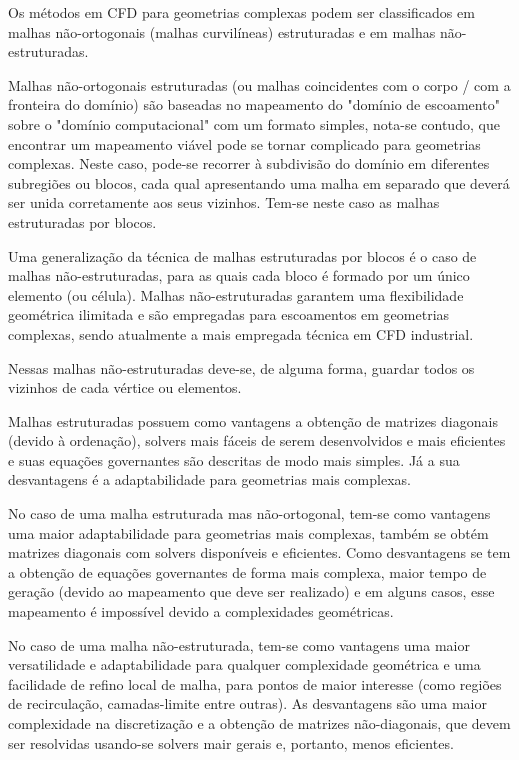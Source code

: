 Os métodos em CFD para geometrias complexas podem ser classificados em malhas não-ortogonais (malhas curvilíneas) estruturadas e em malhas não-estruturadas.

Malhas não-ortogonais estruturadas (ou malhas coincidentes com o corpo / com a fronteira do domínio) são baseadas no mapeamento do "domínio de escoamento" sobre o "domínio computacional" com um formato simples, nota-se contudo, que encontrar um mapeamento viável pode se tornar complicado para geometrias complexas. Neste caso, pode-se recorrer à subdivisão do domínio em diferentes subregiões ou blocos, cada qual apresentando uma malha em separado que deverá ser unida corretamente aos seus vizinhos. Tem-se neste caso as malhas estruturadas por blocos.

Uma generalização da técnica de malhas estruturadas por blocos é o caso de malhas não-estruturadas, para as quais cada bloco é formado por um único elemento (ou célula). Malhas não-estruturadas garantem uma flexibilidade geométrica ilimitada e são empregadas para escoamentos em geometrias complexas, sendo atualmente a mais empregada técnica em CFD industrial.

Nessas malhas não-estruturadas deve-se, de alguma forma, guardar todos os vizinhos de cada vértice ou elementos. \cite{Shewchuk1992}

Malhas estruturadas possuem como vantagens a obtenção de matrizes diagonais (devido à ordenação), solvers mais fáceis de serem desenvolvidos e mais eficientes e suas equações governantes são descritas de modo mais simples. Já a sua desvantagens é a adaptabilidade para geometrias mais complexas.

No caso de uma malha estruturada mas não-ortogonal, tem-se como vantagens uma maior adaptabilidade para geometrias mais complexas, também se obtém matrizes diagonais com solvers disponíveis e eficientes. Como desvantagens se tem a obtenção de equações governantes de forma mais complexa, maior tempo de geração (devido ao mapeamento que deve ser realizado) e em alguns casos, esse mapeamento é impossível devido a complexidades geométricas.

No caso de uma malha não-estruturada, tem-se como vantagens uma maior versatilidade e adaptabilidade para qualquer complexidade geométrica e uma facilidade de refino local de malha, para pontos de maior interesse (como regiões de recirculação, camadas-limite entre outras). As desvantagens são uma maior complexidade na discretização e a obtenção de matrizes não-diagonais, que devem ser resolvidas usando-se solvers mair gerais e, portanto, menos eficientes.

